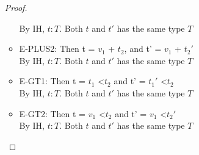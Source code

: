 \documentclass{article}
\begin{document}
\begin{description}
\begin{enumerate}
\begin{proof}
\begin{itemize}
                                By IH, $t:T$. Both $t$ and $t'$ has the same type $T$
                            \item E-PLUS2: Then t = $v_1$ + $t_2$, and t' = $v_1$ + $t_2'$\\
                                By IH, $t:T$. Both $t$ and $t'$ has the same type $T$
                            \item E-GT1: Then t = $t_1$ \textless $t_2$ and t' = $t_1'$ \textless $t_2$\\
                                By IH, $t:T$. Both $t$ and $t'$ has the same type $T$
                            \item E-GT2: Then t = $v_1$ \textless $t_2$ and t' = $v_1$ \textless $t_2'$\\
                            By IH, $t:T$. Both $t$ and $t'$ has the same type $T$
                        \end{itemize}
                    \end{proof}


\end{enumerate}
\end{description}
\end{document}
